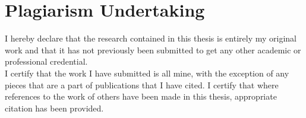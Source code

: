 \chapter*{Plagiarism Undertaking}
I hereby declare that the research contained in this thesis is entirely my original work and that it has not previously been submitted to get any other academic or professional credential.  
\\
I certify that the work I have submitted is all mine, with the exception of any pieces that are a part of publications that I have cited. I certify that where references to the work of others have been made in this thesis, appropriate citation has been provided.

